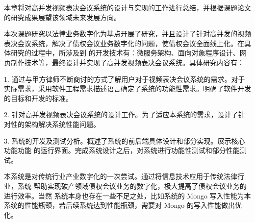 
\begin{summary}
本章将对高并发视频表决会议系统的设计与实现的工作进行总结，并根据课题论文的研究成果展望该领域未来发展方向。

本次课题研究以法律业务数字化为基点开展了研究，并且设计了针对高并发的视频表决会议系统，解决了债权会议业务数字化的问题，使债权会议全面线上化。在具体研究的过程中，所涉及到
的开发技术有：微服务架构、面向对象程序设计、网页制作技术等，最终设计并实现了高并发视频表决会议系统。具体研究内容有：

1. 通过与甲方律师不断商讨的方式了解用户对于视频表决会议系统的需求。对于实际需求，采用软件工程需求描述语言确定了系统的功能性需求。明确了软件开发的目标和开发的标准。

2. 针对高并发视频表决会议系统的设计工作。为了适应本系统的需求，设计了针对性的架构解决系统性能问题。

3. 系统的开发及测试分析。概述了系统的前后端具体设计和部分实现。展示核心功能功能
的运行界面。完成系统设计之后，对系统进行功能性测试和部分性能测试。

本系统是对传统行业产业数字化的一次尝试。通过将信息技术应用于传统法律行业，系统
帮助实现破产领域债权会议业务的数字化，极大提高了债权会议业务的进行效率。当然
系统本身也存在一些不足之处，比如系统的 Mongo 写入性能为本系统的性能瓶颈，若后续系统达到性能瓶颈，需要对 Mongo 的写入性能做出优化。

\end{summary}
